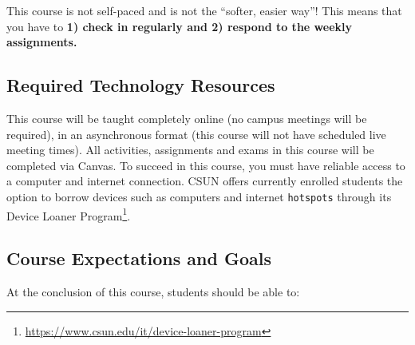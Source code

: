 \documentclass[
  letterpaper,
  DIV=11,
  numbers=noendperiod]{scrartcl}
\DeclareRobustCommand{\href}[2]{#2\footnote{\url{#1}}}
\begin{document}
\begin{tcolorbox}[enhanced jigsaw, colbacktitle=quarto-callout-warning-color!10!white, rightrule=.15mm, opacityback=0, colframe=quarto-callout-warning-color-frame, leftrule=.75mm, breakable, bottomrule=.15mm, arc=.35mm, opacitybacktitle=0.6, title=\textcolor{quarto-callout-warning-color}{\faExclamationTriangle}\hspace{0.5em}{Warning}, titlerule=0mm, toptitle=1mm, bottomtitle=1mm, left=2mm, toprule=.15mm, colback=white, coltitle=black]

This course is not self-paced and is not the ``softer, easier way''!
This means that you have to \textbf{1) check in regularly and 2) respond
to the weekly assignments.}

\end{tcolorbox}

\hypertarget{sec-required-technology-resources}{%
\subsection{Required Technology
Resources}\label{sec-required-technology-resources}}

This course will be taught completely online (no campus meetings will be
required), in an asynchronous format (this course will not have
scheduled live meeting times). All activities, assignments and exams in
this course will be completed via Canvas. To succeed in this course, you
must have reliable access to a computer and internet connection. CSUN
offers currently enrolled students the option to borrow devices such as
computers and internet \texttt{hotspots} through its
\href{https://www.csun.edu/it/device-loaner-program}{Device Loaner
Program}.

\hypertarget{course-expectations-and-goals}{%
\subsection{Course Expectations and
Goals}\label{course-expectations-and-goals}}

At the conclusion of this course, students should be able to:
\end{document}
